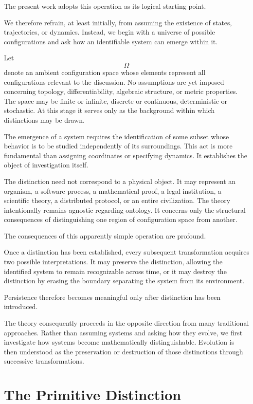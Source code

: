 \documentclass[11pt]{book}
\numberwithin{equation}{chapter}
\theoremstyle{definition}
\theoremstyle{plain}
\begin{document}
The present work adopts this operation as its logical starting point.

We therefore refrain, at least initially, from assuming the existence of states, trajectories, or dynamics. Instead, we begin with a universe of possible configurations and ask how an identifiable system can emerge within it.

Let
\[
\Omega
\]
denote an ambient configuration space whose elements represent all configurations relevant to the discussion. No assumptions are yet imposed concerning topology, differentiability, algebraic structure, or metric properties. The space may be finite or infinite, discrete or continuous, deterministic or stochastic. At this stage it serves only as the background within which distinctions may be drawn.

The emergence of a system requires the identification of some subset whose behavior is to be studied independently of its surroundings. This act is more fundamental than assigning coordinates or specifying dynamics. It establishes the object of investigation itself.

The distinction need not correspond to a physical object. It may represent an organism, a software process, a mathematical proof, a legal institution, a scientific theory, a distributed protocol, or an entire civilization. The theory intentionally remains agnostic regarding ontology. It concerns only the structural consequences of distinguishing one region of configuration space from another.

The consequences of this apparently simple operation are profound.

Once a distinction has been established, every subsequent transformation acquires two possible interpretations. It may preserve the distinction, allowing the identified system to remain recognizable across time, or it may destroy the distinction by erasing the boundary separating the system from its environment.

Persistence therefore becomes meaningful only after distinction has been introduced.

The theory consequently proceeds in the opposite direction from many traditional approaches. Rather than assuming systems and asking how they evolve, we first investigate how systems become mathematically distinguishable. Evolution is then understood as the preservation or destruction of those distinctions through successive transformations.

\section{The Primitive Distinction}
\end{document}
